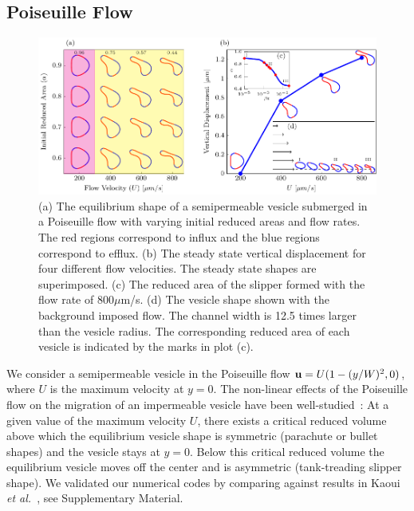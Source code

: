 \documentclass[9pt,twocolumn,twoside,lineno]{pnas-new}
\newif\ifTikz
\begin{document}
\subsection*{Poiseuille Flow}
\begin{figure}[htp]
  \centering
  \ifTikz
  
  \else
  \includegraphics{figures/parabolicComposite.pdf}
  \fi
  \caption{\label{fig:parabolicComposite} (a) The equilibrium shape of
  a semipermeable vesicle submerged in a Poiseuille flow with varying
  initial reduced areas and flow rates. The red regions correspond to
  influx and the blue regions correspond to efflux. (b) The steady
  state vertical displacement for four different flow velocities. The
  steady state shapes are superimposed. (c) The reduced area of the
  slipper formed with the flow rate of $800 \mu$m/s. (d) The vesicle
  shape shown with the background imposed flow. The channel width is
  12.5 times larger than the vesicle radius. The corresponding reduced
  area of each vesicle is indicated by the marks in plot (c).}
\end{figure}


We consider a semipermeable vesicle in the Poiseuille flow $\mathbf{u} =
U(1-(y/W)^2,0)$, where $U$ is the maximum velocity at $y=0$. The
non-linear effects of the Poiseuille flow on the migration of an
impermeable vesicle have been well-studied~\cite{kao-bir-mis2009}: At a
given value of the maximum velocity $U$, there exists a critical reduced
volume above which the equilibrium vesicle shape is symmetric (parachute
or bullet shapes) and the vesicle stays at $y=0$. Below this critical
reduced volume the equilibrium vesicle moves off the center and is
asymmetric (tank-treading slipper shape). We validated our numerical
codes by comparing against results in Kaoui {\em et
al.}~\cite{kao-bir-mis2009}, see Supplementary Material.
\end{document}
